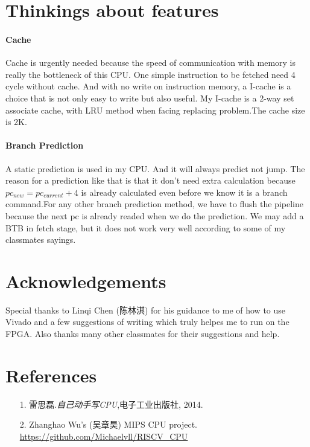 \documentclass[12pt, a4paper]{article}
\theoremstyle{margin}
\begin{document}
\section{Thinkings about features}

\paragraph{Cache} Cache is urgently needed  because the speed of communication with memory is really the bottleneck of this CPU. One simple instruction to be fetched need 4 cycle without cache. And with no write on instruction memory, a I-cache is a choice that is not only easy to write but also useful. My I-cache is a 2-way set associate cache, with LRU method when facing replacing problem.The cache size is 2K.

\paragraph{Branch Prediction} A static prediction is used in my CPU. And it will always predict not jump. The reason for a prediction like that is that it don't need extra calculation because $pc_{new} = pc_{current} + 4$ is already calculated even before we know it is a branch command.For any other branch prediction method, we have to flush the pipeline because the next pc is already readed when we do the prediction. We may add a BTB in fetch stage, but it does not work very well according to some of my classmates sayings.

\section{Acknowledgements}
Special thanks to Linqi Chen (陈林淇) for his guidance to me of how to use Vivado and a few suggestions of writing which truly helpes me to run on the FPGA. Also thanks many other classmates for their suggestions and help.

\section{References}

\begin{enumerate}
    \item [1.]雷思磊.\emph{自己动手写CPU},电子工业出版社, 2014.
    \item [2.]Zhanghao Wu's (吴章昊) MIPS CPU project.
  	\url{https://github.com/Michaelvll/RISCV_CPU}
\end{enumerate}
\end{document}

